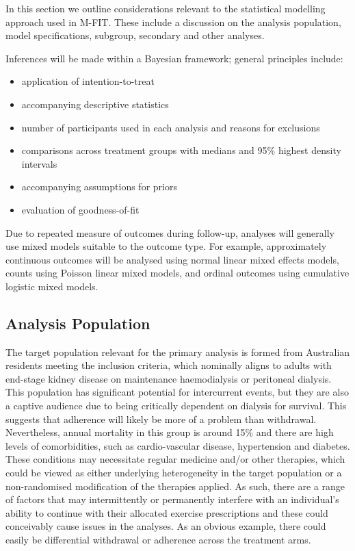 \documentclass[
]{article}
\providecommand{\tightlist}{%
  \setlength{\itemsep}{0pt}\setlength{\parskip}{0pt}}
\begin{document}
In this section we outline considerations relevant to the statistical modelling approach used in M-FIT.
These include a discussion on the analysis population, model specifications, subgroup, secondary and other analyses.

Inferences will be made within a Bayesian framework; general principles include:

\begin{itemize}
  \tightlist
  \item application of intention-to-treat
  \item accompanying descriptive statistics
  \item number of participants used in each analysis and reasons for exclusions
  \item comparisons across treatment groups with medians and 95\% highest density intervals
  \item accompanying assumptions for priors
  \item evaluation of goodness-of-fit
\end{itemize}

Due to repeated measure of outcomes during follow-up, analyses will generally use mixed models suitable to the outcome type.
For example, approximately continuous outcomes will be analysed using normal linear mixed effects models, counts using Poisson linear mixed models, and ordinal outcomes using cumulative logistic mixed models.

\hypertarget{analysis-population}{%
  \subsection{Analysis Population}\label{analysis-population}}

The target population relevant for the primary analysis is formed from Australian residents meeting the inclusion criteria, which nominally aligns to adults with end-stage kidney disease on  maintenance haemodialysis or peritoneal dialysis.
This population has significant potential for intercurrent events, but they are also a captive audience due to being critically dependent on dialysis for survival.
This suggests that adherence will likely be more of a problem than withdrawal.
Nevertheless, annual mortality in this group is around 15\% and there are high levels of  comorbidities, such as cardio-vascular disease, hypertension and diabetes.
These conditions may necessitate regular medicine and/or other therapies, which could be viewed as either underlying heterogeneity in the target population or a non-randomised modification of the therapies applied.
As such, there are a range of factors that may intermittently or permanently interfere with an individual's ability to continue with their allocated exercise prescriptions and these could conceivably cause issues in the analyses.
As an obvious example, there could easily be differential withdrawal or adherence across the treatment arms.
\end{document}
